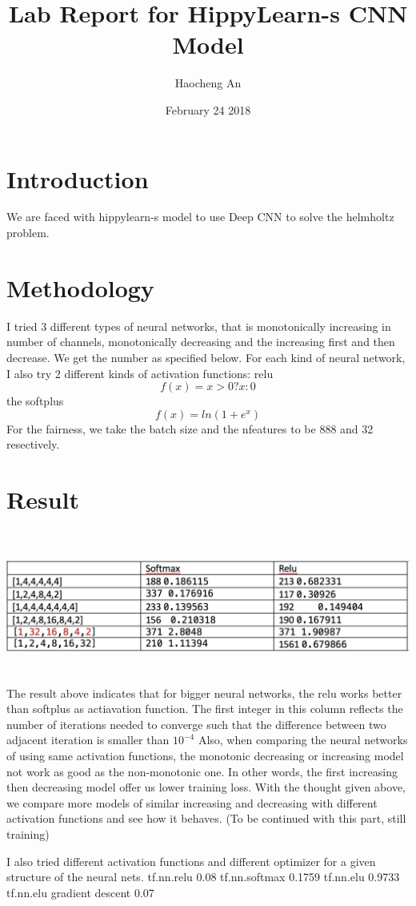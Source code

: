 \documentclass{article}
\title{Lab Report for HippyLearn-s CNN Model}
\author{Haocheng An}
\date{February 24 2018}
\begin{document}
	
	\maketitle
	\section{Introduction}
	We are faced with hippylearn-s model to use Deep CNN to solve the helmholtz problem. 
	\section{Methodology}
	I tried 3 different types of neural networks, that is monotonically increasing in number of channels, monotonically decreasing and the increasing first and then decrease. We get the number as specified below. For each kind of neural network, I also try 2 different kinds of activation functions: relu $$f(x) = x >0 ? x: 0$$ the softplus$$f(x) = ln(1+ e^{x})$$
	For the fairness, we take the batch size and the nfeatures to be 888 and 32 resectively.
	\section{Result}
	\par 
	\includegraphics[width=135mm,height=50mm]{general.png}
	The result above indicates that for bigger neural networks, the relu works better than softplus as actiavation function.
	The first integer in this column reflects the number of iterations needed to converge such that the difference between two adjacent iteration is smaller than $10^{-4}$
	Also, when comparing the neural networks of using same activation functions, the monotonic decreasing or increasing model not work as good as the non-monotonic one. In other words, the first increasing then decreasing model offer us lower training loss. With the thought given above, we compare more models of similar increasing and decreasing with different activation functions and see how it behaves. (To be continued with this part, still training)
	\par I also tried different activation functions and different optimizer for a given structure of the neural nets.
	tf.nn.relu 0.08
	tf.nn.softmax 0.1759
	tf.nn.elu 0.9733
	tf.nn.elu gradient descent 0.07
	
\end{document}
